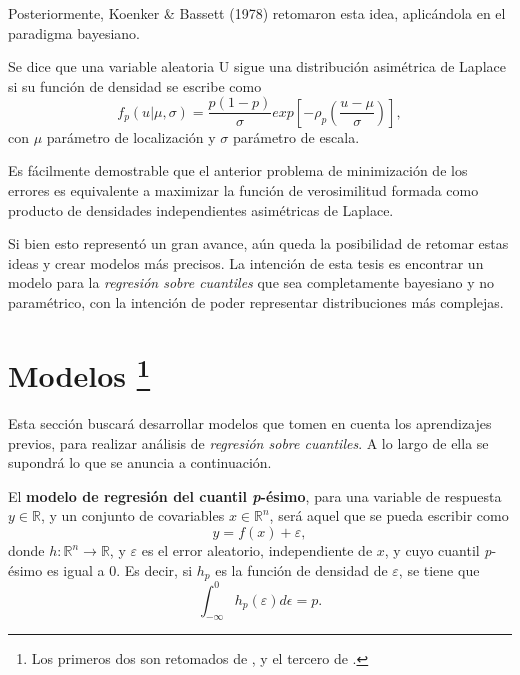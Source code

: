 Posteriormente, Koenker \& Bassett (1978) retomaron esta idea, aplic\'andola en el paradigma bayesiano. 

\begin{defin}
    Se dice que una variable aleatoria U sigue una distribuci\'on asim\'etrica de Laplace si su funci\'on de densidad se escribe como
    \begin{equation*}
        f_p(u|\mu,\sigma) = 
        \frac{p(1-p)}{\sigma}
        exp\left[
        -\rho_p
        \left(
        \frac{u-\mu}{\sigma}
        \right)
        \right],
    \end{equation*}
con $\mu$ par\'ametro de localizaci\'on y $\sigma$ par\'ametro de escala.
\end{defin}

Es f\'acilmente demostrable que el anterior problema de minimizaci\'on de los errores es equivalente a maximizar la funci\'on de verosimilitud formada como producto de densidades independientes asim\'etricas de Laplace.

Si bien esto represent\'o un gran avance, a\'un queda la posibilidad de retomar estas ideas y crear modelos m\'as precisos. La intenci\'on de esta tesis es encontrar un modelo para la \textit{regresi\'on sobre cuantiles} que sea completamente bayesiano y no param\'etrico, con la intenci\'on de poder representar distribuciones m\'as complejas.

\section[Modelos]{
    Modelos
    \footnote{Los primeros dos son retomados de \cite{Kottas_SemiparamQuantReg}, y el tercero de \cite{Kottas_NotParamQuantReg}.}
}

Esta secci\'on buscar\'a desarrollar modelos que tomen en cuenta los aprendizajes previos, para realizar an\'alisis de \textit{regresi\'on sobre cuantiles}. A lo largo de ella se supondr\'a lo que se anuncia a continuaci\'on.

\begin{defin}
    El \textbf{modelo de regresi\'on del cuantil \textit{p}-\'esimo}, para una variable de respuesta $y \in \mathbb{R}$, y un conjunto de covariables $x \in \mathbb{R}^n$, ser\'a aquel que se pueda escribir como
    \begin{equation*}
        y = f(x) + \varepsilon,
    \end{equation*}
    donde $h: \mathbb{R}^{n} \rightarrow \mathbb{R}$, y $\varepsilon$ es el error aleatorio, independiente de $x$, y cuyo cuantil \textit{p}-\'esimo es igual a $0$. Es decir, si $h_p$ es la funci\'on de densidad de $\varepsilon$, se tiene que
    \begin{equation*}
        \int_{-\infty}^0 h_p(\varepsilon) d\epsilon = p.
    \end{equation*}
\end{defin}

